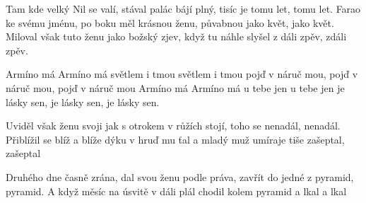 
\beginverse{}
Tam kde velký Nil se valí, stával palác bájí plný,
tisíc je tomu let, tomu let.
Farao ke svému jménu, po boku měl krásnou ženu,
půvabnou jako květ, jako květ.
Miloval však tuto ženu jako božský zjev,
když tu náhle slyšel z dáli zpěv, zdáli zpěv.
\endverse{}

\beginchorus{}
Armíno má Armíno má světlem i tmou světlem i tmou
pojď v náruč mou, pojď v náruč mou, pojď v náruč mou
Armíno má Armíno má u tebe jen u tebe jen
je lásky sen, je lásky sen, je lásky sen.
\endchorus{}

\beginverse{}
Uviděl však ženu svoji jak s otrokem v růžích stojí,
toho se nenadál, nenadál.
Přiblížil se blíž a blíže
dýku v hruď mu ťal a mladý muž umíraje tiše zašeptal, zašeptal
\endverse{}

\beginchorus{}
\phantom{}
\endchorus{}

\beginverse{}
Druhého dne časně zrána, dal svou ženu podle práva,
zavřít do jedné z pyramid, pyramid.
A když měsíc na úsvitě v dáli plál
chodil kolem pyramid a lkal a lkal
\endverse{}

\beginchorus{}
\phantom{}
\endchorus{}

\endsong{}
